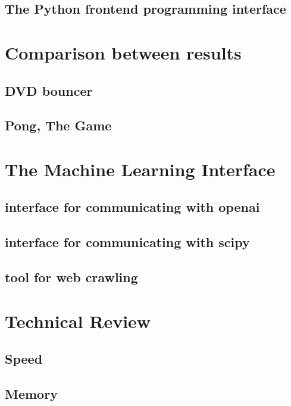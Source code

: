     \section*{The Python frontend programming interface}

\chapter*{Comparison between results}
    \section*{DVD bouncer}

    \section*{Pong, The Game}

\chapter*{The Machine Learning Interface}
    \section*{interface for communicating with openai}
    \section*{interface for communicating with scipy}
    \section*{tool for web crawling}

\chapter*{Technical Review}
    \section*{Speed}
    \section*{Memory}


